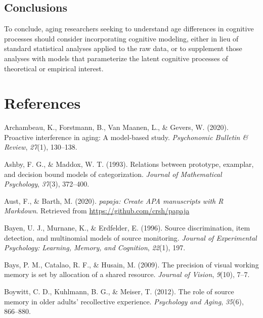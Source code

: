 \documentclass[
  english,
  ,man,floatsintext]{apa6}
\begin{document}
\hypertarget{conclusions}{%
\subsection{Conclusions}\label{conclusions}}

To conclude, aging researchers seeking to understand age differences in cognitive processes should consider incorporating cognitive modeling, either in lieu of standard statistical analyses applied to the raw data, or to supplement those analyses with models that parameterize the latent cognitive processes of theoretical or empirical interest.

\newpage

\hypertarget{references}{%
\section{References}\label{references}}

\setlength{\parindent}{-0.5in}
\setlength{\leftskip}{0.5in}

\hypertarget{refs}{}
\leavevmode\hypertarget{ref-archambeau2020proactive}{}%
Archambeau, K., Forstmann, B., Van Maanen, L., \& Gevers, W. (2020). Proactive interference in aging: A model-based study. \emph{Psychonomic Bulletin \& Review}, \emph{27}(1), 130--138.

\leavevmode\hypertarget{ref-AshbyAndMaddox1993}{}%
Ashby, F. G., \& Maddox, W. T. (1993). Relations between prototype, examplar, and decision bound models of categorization. \emph{Journal of Mathematical Psychology}, \emph{37}(3), 372--400.

\leavevmode\hypertarget{ref-R-papaja}{}%
Aust, F., \& Barth, M. (2020). \emph{papaja: Create APA manuscripts with R Markdown}. Retrieved from \url{https://github.com/crsh/papaja}

\leavevmode\hypertarget{ref-bayen1996source}{}%
Bayen, U. J., Murnane, K., \& Erdfelder, E. (1996). Source discrimination, item detection, and multinomial models of source monitoring. \emph{Journal of Experimental Psychology: Learning, Memory, and Cognition}, \emph{22}(1), 197.

\leavevmode\hypertarget{ref-bays2009precision}{}%
Bays, P. M., Catalao, R. F., \& Husain, M. (2009). The precision of visual working memory is set by allocation of a shared resource. \emph{Journal of Vision}, \emph{9}(10), 7--7.

\leavevmode\hypertarget{ref-BoywittEtAl2012}{}%
Boywitt, C. D., Kuhlmann, B. G., \& Meiser, T. (2012). The role of source memory in older adults' recollective experience. \emph{Psychology and Aging}, \emph{35}(6), 866--880.
\end{document}
